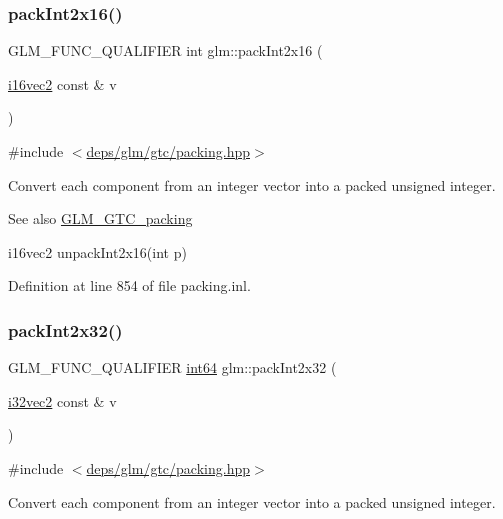 \subsubsection{\texorpdfstring{pack\+Int2x16()}{packInt2x16()}}
{\footnotesize\ttfamily G\+L\+M\+\_\+\+F\+U\+N\+C\+\_\+\+Q\+U\+A\+L\+I\+F\+I\+ER int glm\+::pack\+Int2x16 (\begin{DoxyParamCaption}\item[{\hyperlink{group__gtc__type__precision_gad912fd04abb876a5b806118ec6e0f283}{i16vec2} const \&}]{v }\end{DoxyParamCaption})}



{\ttfamily \#include $<$\hyperlink{gtc_2packing_8hpp}{deps/glm/gtc/packing.\+hpp}$>$}

Convert each component from an integer vector into a packed unsigned integer.

\begin{DoxySeeAlso}{See also}
\hyperlink{group__gtc__packing}{G\+L\+M\+\_\+\+G\+T\+C\+\_\+packing} 

i16vec2 unpack\+Int2x16(int p) 
\end{DoxySeeAlso}


Definition at line 854 of file packing.\+inl.

\mbox{\label{group__gtc__packing_ga1d6c24ff4f2b198eb2c4a2e4dcf7c336}} 
\subsubsection{\texorpdfstring{pack\+Int2x32()}{packInt2x32()}}
{\footnotesize\ttfamily G\+L\+M\+\_\+\+F\+U\+N\+C\+\_\+\+Q\+U\+A\+L\+I\+F\+I\+ER \hyperlink{group__gtc__type__precision_ga435d75819cce297cc5fa21bd84ef89a5}{int64} glm\+::pack\+Int2x32 (\begin{DoxyParamCaption}\item[{\hyperlink{group__gtc__type__precision_ga99191e0de942ecc1df32d522f8064789}{i32vec2} const \&}]{v }\end{DoxyParamCaption})}



{\ttfamily \#include $<$\hyperlink{gtc_2packing_8hpp}{deps/glm/gtc/packing.\+hpp}$>$}

Convert each component from an integer vector into a packed unsigned integer.

